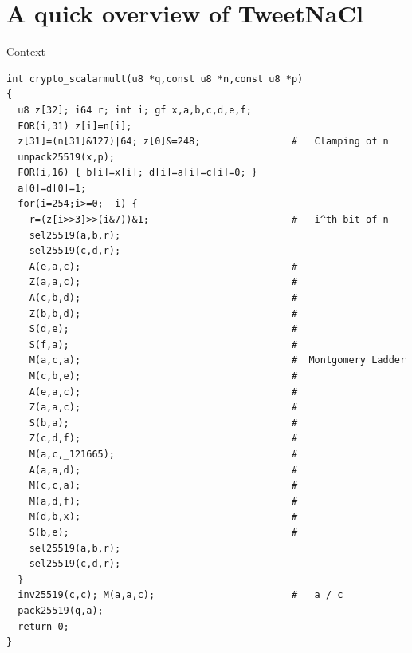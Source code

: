 \documentclass[8pt]{beamer}
\newcommand{\chapternote}[1]{{%
  \let\thempfn\relax%
  \footnotetext[0]{#1}%
}}
\begin{document}
\section{A quick overview of TweetNaCl}
%
%
\begin{frame}[fragile]{Context}
  \vspace{-0.5cm}
  \begin{center}
\begin{lstlisting}[language=Ctweetnacl, caption=crypto\_scalarmult, label=cod:languageC11]
int crypto_scalarmult(u8 *q,const u8 *n,const u8 *p)
{
  u8 z[32]; i64 r; int i; gf x,a,b,c,d,e,f;
  FOR(i,31) z[i]=n[i];
  z[31]=(n[31]&127)|64; z[0]&=248;                #   Clamping of n
  unpack25519(x,p);
  FOR(i,16) { b[i]=x[i]; d[i]=a[i]=c[i]=0; }
  a[0]=d[0]=1;
  for(i=254;i>=0;--i) {
    r=(z[i>>3]>>(i&7))&1;                         #   i^th bit of n
    sel25519(a,b,r);
    sel25519(c,d,r);
    A(e,a,c);                                     #
    Z(a,a,c);                                     #
    A(c,b,d);                                     #
    Z(b,b,d);                                     #
    S(d,e);                                       #
    S(f,a);                                       #
    M(a,c,a);                                     #  Montgomery Ladder
    M(c,b,e);                                     #
    A(e,a,c);                                     #
    Z(a,a,c);                                     #
    S(b,a);                                       #
    Z(c,d,f);                                     #
    M(a,c,_121665);                               #
    A(a,a,d);                                     #
    M(c,c,a);                                     #
    M(a,d,f);                                     #
    M(d,b,x);                                     #
    S(b,e);                                       #
    sel25519(a,b,r);
    sel25519(c,d,r);
  }
  inv25519(c,c); M(a,a,c);                        #   a / c
  pack25519(q,a);
  return 0;
}
\end{lstlisting}

  \end{center}

\end{frame}
\end{document}
